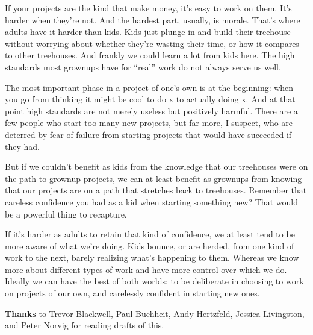 If your projects are the kind that make money, it's easy to work on
them. It's harder when they're not. And the hardest part, usually, is
morale. That's where adults have it harder than kids. Kids just plunge
in and build their treehouse without worrying about whether they're
wasting their time, or how it compares to other treehouses. And frankly
we could learn a lot from kids here. The high standards most grownups
have for ``real'' work do not always serve us well.

The most important phase in a project of one's own is at the beginning:
when you go from thinking it might be cool to do x to actually doing x.
And at that point high standards are not merely useless but positively
harmful. There are a few people who start too many new projects, but far
more, I suspect, who are deterred by fear of failure from starting
projects that would have succeeded if they had.

But if we couldn't benefit as kids from the knowledge that our
treehouses were on the path to grownup projects, we can at least benefit
as grownups from knowing that our projects are on a path that stretches
back to treehouses. Remember that careless confidence you had as a kid
when starting something new? That would be a powerful thing to
recapture.

If it's harder as adults to retain that kind of confidence, we at least
tend to be more aware of what we're doing. Kids bounce, or are herded,
from one kind of work to the next, barely realizing what's happening to
them. Whereas we know more about different types of work and have more
control over which we do. Ideally we can have the best of both worlds:
to be deliberate in choosing to work on projects of our own, and
carelessly confident in starting new ones.


\textbf{Thanks} to Trevor Blackwell, Paul Buchheit, Andy Hertzfeld,
Jessica Livingston, and Peter Norvig for reading drafts of this.